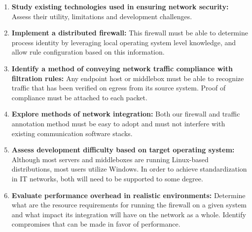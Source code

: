 \begin{enumerate}
    \item \textbf{Study existing technologies used in ensuring network security:}
          Assess their utility, limitations and development challenges.
    \item \textbf{Implement a distributed firewall:} This firewall must be able
          to determine process identity by leveraging local operating system
          level knowledge, and allow rule configuration based on this information.
    \item \textbf{Identify a method of conveying network traffic compliance with
          filtration rules:} Any endpoint host or middlebox must be able to
          recognize traffic that has been verified on egress from its source
          system. Proof of compliance must be attached to each packet.
    \item \textbf{Explore methods of network integration:} Both our firewall and
          traffic annotation method must be easy to adopt and must not interfere
          with existing communication software stacks.
    \item \textbf{Assess development difficulty based on target operating system:}
          Although most servers and middleboxes are running Linux-based
          distributions, most users utilize Windows. In order to achieve
          standardization in IT networks, both will need to be supported to
          some degree.
   \item \textbf{Evaluate performance overhead in realistic environments:}
          Determine what are the resource requirements for running the firewall
          on a given system and what impact its integration will have on the
          network as a whole. Identify compromises that can be made in favor of
          performance.
\end{enumerate}

